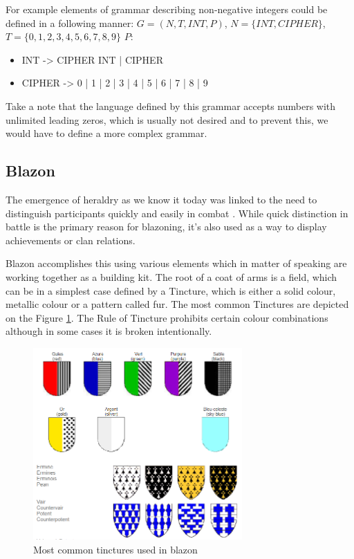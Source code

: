 \documentclass[12pt,a4paper]{article}
\begin{document}
For example elements of grammar describing non-negative integers could be defined in a following manner: $G = (N, T, INT, P)$, $N = \{INT, CIPHER\}$, $T = \{0, 1, 2, 3, 4, 5, 6, 7, 8, 9\}$
$P: $
\begin{itemize}	\setlength\itemsep{-0.5em}
	\item INT -> CIPHER INT | CIPHER
	\item CIPHER -> 0 | 1 | 2 | 3 | 4 | 5 | 6 | 7 | 8 | 9 
\end{itemize}
Take a note that the language defined by this grammar accepts numbers with unlimited leading zeros, which is usually not desired and to prevent this, we would have to define a more complex grammar.

\subsection{Blazon}
The emergence of heraldry as we know it today was linked to the need to distinguish participants quickly and easily in combat \cite{InternationalHeraldry}.
While quick distinction in battle is the primary reason for blazoning, it's also used as a way to display achievements or clan relations.

Blazon accomplishes this using various elements which in matter of speaking are working together as a building kit. The root of a coat of arms is a field, which can be in a simplest case defined by a Tincture, which is either a solid colour, metallic colour or a pattern called fur. The most common Tinctures are depicted on the Figure \ref{tinctures}. The Rule of Tincture prohibits certain colour combinations although in some cases it is broken intentionally.
\begin{figure}[h]
	\centering
	\includegraphics[width=80mm]{img/tinctures.png}
	\caption{Most common tinctures used in blazon \cite{InternationalHeraldry}}
	\label{tinctures}
\end{figure}
\end{document}
